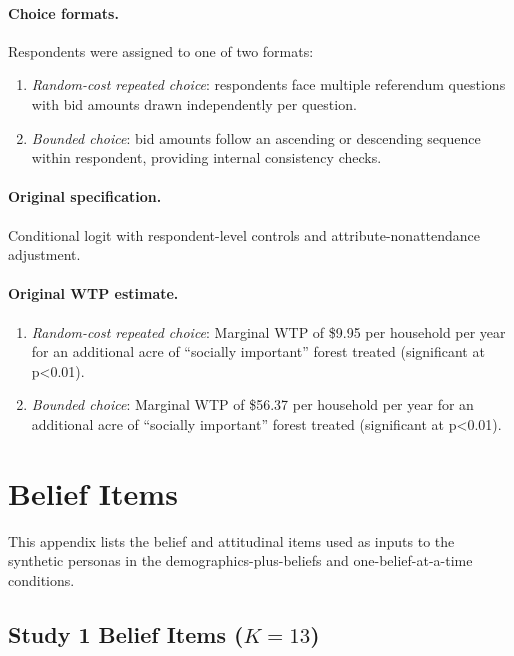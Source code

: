 \documentclass[12pt]{article}
\begin{document}
\paragraph{Choice formats.} Respondents were assigned to one of two formats:
\begin{enumerate}[noitemsep]
    \item \textit{Random-cost repeated choice}: respondents face multiple referendum questions with bid amounts drawn independently per question.
    \item \textit{Bounded choice}: bid amounts follow an ascending or descending sequence within respondent, providing internal consistency checks.
\end{enumerate}

\paragraph{Original specification.} Conditional logit with respondent-level controls and attribute-nonattendance adjustment.

\paragraph{Original WTP estimate.} 
\begin{enumerate}[noitemsep]
    \item \textit{Random-cost repeated choice}: Marginal WTP of \$9.95 per household per year for an additional acre of ``socially important'' forest treated (significant at p<0.01).
    \item \textit{Bounded choice}: Marginal WTP of \$56.37 per household per year for an additional acre of ``socially important'' forest treated (significant at p<0.01).
\end{enumerate}

\section{Belief Items}\label{app:belief-items}

This appendix lists the belief and attitudinal items used as inputs to the synthetic personas in the demographics-plus-beliefs and one-belief-at-a-time conditions.

\subsection{Study 1 Belief Items ($K = 13$)}
\end{document}
